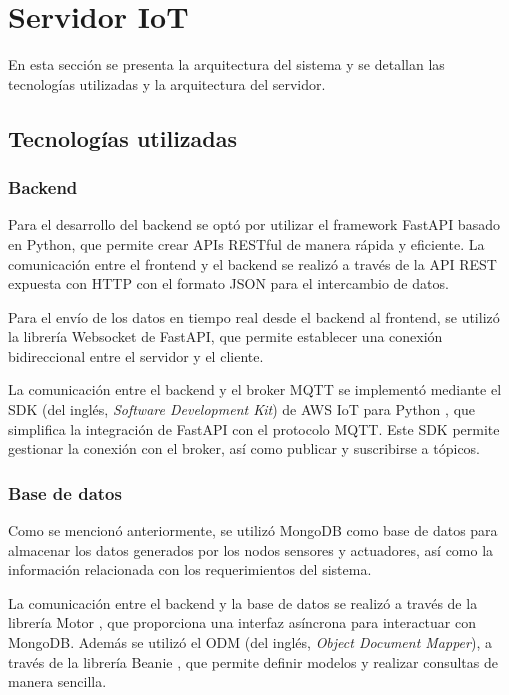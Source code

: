\section{Servidor IoT}

En esta sección se presenta la arquitectura del sistema y se detallan las
tecnologías utilizadas y la arquitectura del servidor.

\subsection{Tecnologías utilizadas}

\subsubsection{Backend}

Para el desarrollo del backend se optó por utilizar el framework FastAPI basado
en Python, que permite crear APIs RESTful de manera rápida y eficiente. La
comunicación entre el frontend y el backend se realizó a través de la API REST
expuesta con HTTP con el formato JSON para el intercambio de datos.

Para el envío de los datos en tiempo real desde el backend al frontend, se
utilizó la librería Websocket \cite{FastAPIWebSockets} de FastAPI, que permite
establecer una conexión bidireccional entre el servidor y el cliente.

La comunicación entre el backend y el broker MQTT se implementó mediante el SDK
(del inglés, \textit{Software Development Kit}) de AWS IoT para Python
\cite{AWSIoTSDK}, que simplifica la integración de FastAPI con el protocolo
MQTT. Este SDK permite gestionar la conexión con el broker, así como publicar y
suscribirse a tópicos.

\subsubsection{Base de datos}

Como se mencionó anteriormente, se utilizó MongoDB como base de datos para
almacenar los datos generados por los nodos sensores y actuadores, así como la
información relacionada con los requerimientos del sistema.

La comunicación entre el backend y la base de datos se realizó a través de la
librería Motor \cite{MotorMongoDB}, que proporciona una interfaz asíncrona para
interactuar con MongoDB. Además se utilizó el ODM (del inglés, \textit{Object
    Document Mapper}), a través de la librería Beanie \cite{BeaniODM}, que permite
definir modelos y realizar consultas de manera sencilla.

